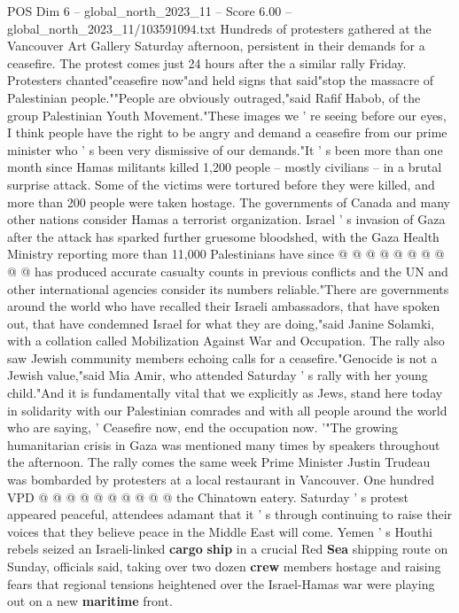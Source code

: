 \begin{textsample}{POS Dim 6 – global\_north\_2023\_11 – Score 6.00 – global\_north\_2023\_11/103591094.txt}  \label{ex:f6_pos_256}
Hundreds of protesters gathered at the Vancouver Art Gallery Saturday afternoon, persistent in their demands for a ceasefire.
The protest comes just 24 hours after the a similar rally Friday.
Protesters chanted"ceasefire now"and held signs that said"stop the massacre of Palestinian people.""People are obviously outraged,"said Rafif Habob, of the group Palestinian Youth Movement."These images we ' re seeing before our eyes, I think people have the right to be angry and demand a ceasefire from our prime minister who ' s been very dismissive of our demands."It ' s been more than one month since Hamas militants killed 1,200 people -- mostly civilians -- in a brutal surprise attack.
Some of the victims were tortured before they were killed, and more than 200 people were taken hostage.
The governments of Canada and many other nations consider Hamas a terrorist organization.
Israel ' s invasion of Gaza after the attack has sparked further gruesome bloodshed, with the Gaza Health Ministry reporting more than 11,000 Palestinians have since @ @ @ @ @ @ @ @ @ @ has produced accurate casualty counts in previous conflicts and the UN and other international agencies consider its numbers reliable."There are governments around the world who have recalled their Israeli ambassadors, that have spoken out, that have condemned Israel for what they are doing,"said Janine Solamki, with a collation called Mobilization Against War and Occupation.
The rally also saw Jewish community members echoing calls for a ceasefire."Genocide is not a Jewish value,"said Mia Amir, who attended Saturday ' s rally with her young child."And it is fundamentally vital that we explicitly as Jews, stand here today in solidarity with our Palestinian comrades and with all people around the world who are saying, ' Ceasefire now, end the occupation now. '"The growing humanitarian crisis in Gaza was mentioned many times by speakers throughout the afternoon.
The rally comes the same week Prime Minister Justin Trudeau was bombarded by protesters at a local restaurant in Vancouver.
One hundred VPD @ @ @ @ @ @ @ @ @ @ the Chinatown eatery.
Saturday ' s protest appeared peaceful, attendees adamant that it ' s through continuing to raise their voices that they believe peace in the Middle East will come.
Yemen ' s Houthi rebels seized an Israeli-linked \textbf{cargo} \textbf{ship} in a crucial Red \textbf{Sea} shipping route on Sunday, officials said, taking over two dozen \textbf{crew} members hostage and raising fears that regional tensions heightened over the Israel-Hamas war were playing out on a new \textbf{maritime} front.

\end{textsample}
